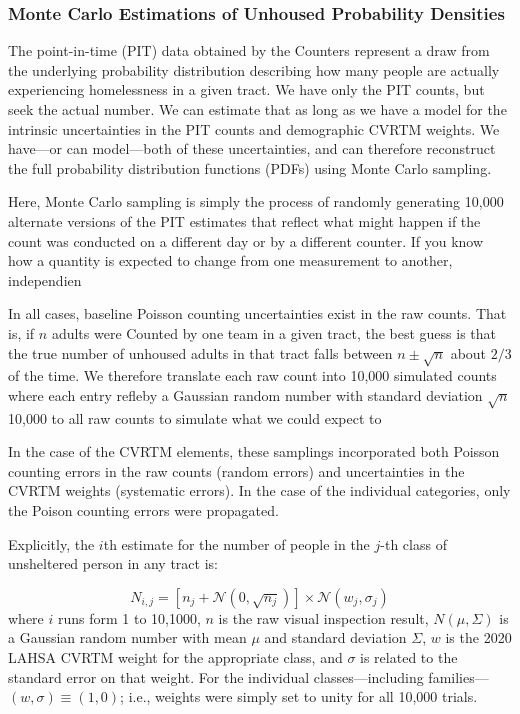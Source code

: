 \documentclass[11pt]{article}
\begin{document}
\subsubsection{Monte Carlo Estimations of Unhoused Probability Densities}
\label{sec:mc}

The point-in-time (PIT) data obtained by the Counters represent a draw from the underlying probability
distribution describing how many people are actually experiencing homelessness in a given tract. We have
only the PIT counts, but seek the actual number. We can estimate that as long as we have a model for
the intrinsic uncertainties in the PIT counts and demographic CVRTM weights. We have---or can 
model---both of these uncertainties, and can therefore reconstruct the full probability distribution 
functions (PDFs) using Monte Carlo sampling.

Here, Monte Carlo sampling is simply the process of randomly generating 10,000 alternate versions of
the PIT estimates that reflect what might happen if the count was conducted on a different day or by
a different counter. If you know how a quantity is expected to change from one measurement to another,
independien 

In all cases, baseline Poisson counting uncertainties exist in the raw counts. That is, if $n$ adults were 
Counted by one team in a given tract, the best guess is that the true number of unhoused adults 
in that tract falls between $n\pm\sqrt{n}$ about $2/3$ of the time. We therefore translate each raw 
count into 10,000 simulated counts where each entry refleby a Gaussian random number with standard deviation $\sqrt{n}$ 10,000
to all raw counts to simulate what we could expect to 

In the case of the CVRTM elements, these samplings incorporated both Poisson counting 
errors in the raw counts (random errors) and uncertainties in the CVRTM weights (systematic errors). 
In the case of the individual categories, only the Poison counting errors were propagated.

Explicitly, the $i$th estimate for the number of people in the $j$-th class of unsheltered person in any
tract is:

\begin{equation}\label{eq:monte}
	N_{i,j} = \left[n_{j} + \mathcal{N}(0,\sqrt{n_{j}})\right]\times\mathcal{N}(w_{j}, \sigma_{j})
\end{equation}
where $i$ runs form 1 to 10,1000, $n$ is the raw visual inspection result, $N(\mu,\Sigma)$ is a 
Gaussian random number with mean $\mu$ and standard deviation $\Sigma$, $w$ is the 2020 
LAHSA CVRTM weight for the appropriate class, and $\sigma$ is related to the standard error on that 
weight. For the individual classes---including families---$(w,\sigma)\equiv(1,0)$; i.e., weights were simply 
set to unity for all 10,000 trials.
\end{document}
